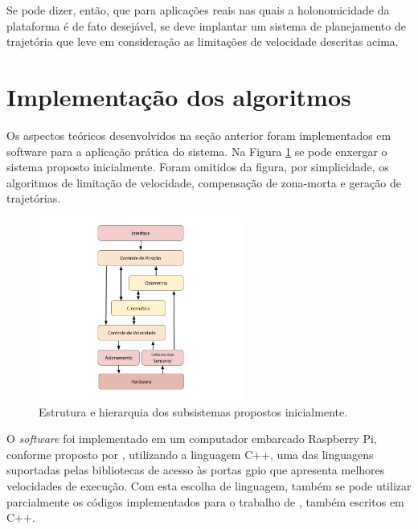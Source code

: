 Se pode dizer, então, que para aplicações reais nas quais a holonomicidade da plataforma é de fato desejável, se deve implantar um sistema de planejamento de trajetória que leve em consideração as limitações de velocidade descritas acima.

\section{Implementação dos algoritmos}
\label{sec:software}

Os aspectos teóricos desenvolvidos na seção anterior foram implementados em software para a aplicação prática do sistema. Na Figura \ref{fig:sistema} se pode enxergar o sistema proposto inicialmente. Foram omitidos da figura, por simplicidade, os algoritmos de limitação de velocidade, compensação de zona-morta e geração de trajetórias.

\begin{figure}[h]
  \centering
  \includegraphics[width = 0.6\textwidth]{imagens/sistema}
  \caption{Estrutura e hierarquia dos subsistemas propostos inicialmente.}
  \label{fig:sistema}
\end{figure}

O \textit{software} foi implementado em um computador embarcado Raspberry Pi, conforme proposto por \citet{ritter2016modelagem}, utilizando a linguagem C++, uma das linguagens suportadas pelas bibliotecas de acesso às portas \acrshort{gpio} que apresenta melhores velocidades de execução. Com esta escolha de linguagem, também se pode utilizar parcialmente os códigos implementados para o trabalho de \citet{ritter2016modelagem}, também escritos em C++.



